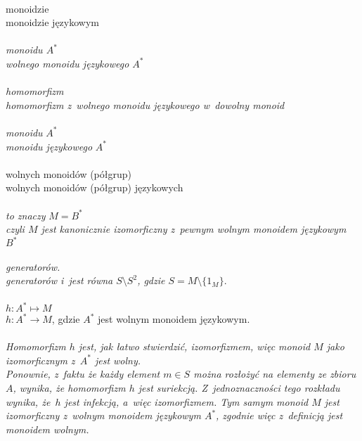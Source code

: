 \documentclass[a4paper,11pt]{article}
\begin{document}
 \\
\Jest  monoidzie \\
\Powin monoidzie językowym \\
 \\
\Jest  \textit{monoidu $A^{ * }$} \\
\Powin \textit{wolnego monoidu językowego $A^{ * }$} \\
 \\
\Jest  \textit{homomorfizm} \\
\Powin \textit{homomorfizm z~wolnego monoidu językowego w~dowolny monoid} \\
 \\
\Jest  \textit{monoidu} $A^{ * }$ \\
\Powin \textit{monoidu językowego} $A^{ * }$ \\
 \\
\Jest  wolnych monoidów (półgrup) \\
\Powin wolnych monoidów (półgrup) językowych \\
 \\
\Jest  \textit{to znaczy} $M = B^{ * }$ \\
\Powin \textit{czyli $M$ jest kanonicznie izomorficzny z~pewnym wolnym
  monoidem językowym $B^{ * }$} \\
 \\
\Jest  \textit{generatorów.} \\
\Powin \textit{generatorów i~jest równa $S \setminus S^{ 2 }$, gdzie
  $S = M \setminus \{ 1_{ M } \}$}. \\
 \\
\Jest  $h : A^{ * } \mapsto M$ \\
\Powin $h : A^{ * } \to M$, gdzie $A^{ * }$ jest wolnym monoidem językowym. \\
 \\
\Jest  \textit{Homomorfizm $h$ jest, jak łatwo stwierdzić, izomorfizmem,
  więc monoid $M$ jako izomorficznym z~$A^{ * }$ jest wolny.} \\
\Powin \textit{Ponownie, z~faktu że każdy element $m \in S$ można rozłożyć na
  elementy ze zbioru $A$, wynika, że homomorfizm $h$ jest suriekcją.
  Z~jednoznaczności tego rozkładu wynika, że~$h$ jest infekcją, a~więc
  izomorfizmem. Tym samym monoid $M$ jest izomorficzny z~wolnym monoidem
  językowym $A^{ * }$, zgodnie więc z~definicją jest monoidem wolnym.}




\vspace{\spaceTwo}












{}






\end{document}
